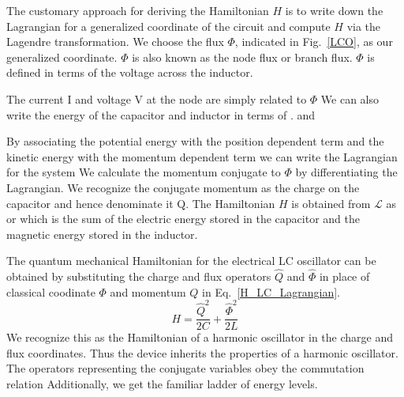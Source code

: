 The customary approach for deriving the Hamiltonian $H$ is to write down the Lagrangian for a generalized coordinate of the circuit and compute $H$ via the Lagendre transformation.
We choose the flux $\Phi$, indicated in Fig.~\ref{LCO}, as our generalized coordinate.  $\Phi$ is also known as the node flux or branch flux.  $\Phi$ is defined in terms of the voltage across the inductor.

\noindent
The current I and voltage V at the node are simply related to $\Phi$
We can also write the energy of the capacitor and inductor in terms of \Phi.
and

\noindent
By associating the potential energy with the position dependent term and the kinetic energy with the momentum dependent term we can write the Lagrangian for the system
We calculate the momentum conjugate to $\Phi$ by differentiating the Lagrangian.
We recognize the conjugate momentum as the charge on the capacitor and hence denominate it Q.
The Hamiltonian $H$ is obtained from $\mathcal{L}$ as
or
which is the sum of the electric energy stored in the capacitor and the magnetic energy stored in the inductor.

The quantum mechanical Hamiltonian for the electrical LC oscillator can be obtained by substituting the charge and flux operators $\hat{Q}$ and $\hat{\Phi}$
in place of classical coodinate $\Phi$ and momentum $Q$ in Eq.~\ref{H_LC_Lagrangian}.
\begin{equation}
    H = \frac{\hat{Q}^2}{2C} + \frac{\hat{\Phi}^2}{2L}
\end{equation}
We recognize this as the Hamiltonian of a harmonic oscillator in the charge and flux coordinates.
Thus the device inherits the properties of a harmonic oscillator.
The operators representing the conjugate variables obey the commutation relation
Additionally, we get the familiar ladder of energy levels.

